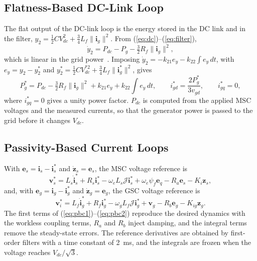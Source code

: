 \documentclass[11pt,a4paper]{article}
\newcommand{\bv}[1]{\mathbf{#1}}
\newcommand{\Jm}{\boldsymbol{\mathcal{J}}}
\begin{document}
\subsection{Flatness-Based DC-Link Loop}
The flat output of the DC-link loop is the energy stored in the DC link and in the filter,
$y_2=\frac12CV_{dc}^2+\frac34L_f\|\bv{i}_g\|^2$. From (\ref{eq:dc})--(\ref{eq:filter}),
\begin{equation}
\dot y_2 = P_{dc} - P_g - \tfrac32R_f\|\bv{i}_g\|^2 ,
\label{eq:y2}
\end{equation}
which is linear in the grid power~\cite{thounthong2010}. Imposing $\dot y_2=-k_{21}e_y-k_{22}\int e_y\,dt$,
with $e_y=y_2-y_2^*$ and $y_2^*=\frac12CV_{dc}^{*2}+\frac34L_f\|\bv{i}_g^*\|^2$, gives
\begin{equation}
P_g^* = P_{dc} - \tfrac32R_f\|\bv{i}_g\|^2 + k_{21}e_y + k_{22}\!\int\! e_y\,dt,\qquad
i_{gd}^*=\frac{2P_g^*}{3v_{gd}},\qquad i_{gq}^*=0 ,
\label{eq:flat2}
\end{equation}
where $i_{gq}^*=0$ gives a unity power factor. $P_{dc}$ is computed from the applied MSC voltages and the
measured currents, so that the generator power is passed to the grid before it changes $V_{dc}$.

\subsection{Passivity-Based Current Loops}
With $\bv{e}_s=\bv{i}_s-\bv{i}_s^*$ and $\dot{\bv{z}}_s=\bv{e}_s$, the MSC voltage reference is
\begin{equation}
\bv{v}_s^* = L_s\dot{\bv{i}}_s^* + R_s\bv{i}_s^* - \omega_eL_s\Jm\bv{i}_s^* + \omega_e\psi_f\bv{e}_q
- R_a\bv{e}_s - K_i\bv{z}_s ,
\label{eq:pbc1}
\end{equation}
and, with $\bv{e}_g=\bv{i}_g-\bv{i}_g^*$ and $\dot{\bv{z}}_g=\bv{e}_g$, the GSC voltage reference is
\begin{equation}
\bv{v}_i^* = L_f\dot{\bv{i}}_g^* + R_f\bv{i}_g^* - \omega_gL_f\Jm\bv{i}_g^* + \bv{v}_g
- R_b\bv{e}_g - K_{ig}\bv{z}_g .
\label{eq:pbc2}
\end{equation}
The first terms of (\ref{eq:pbc1})--(\ref{eq:pbc2}) reproduce the desired dynamics with the workless
coupling terms, $R_a$ and $R_b$ inject damping, and the integral terms remove the steady-state errors.
The reference derivatives are obtained by first-order filters with a time constant of 2~ms, and the
integrals are frozen when the voltage reaches $V_{dc}/\sqrt3$.
\end{document}
